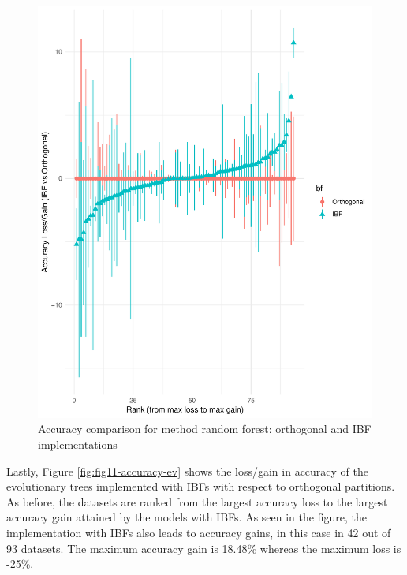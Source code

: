 \documentclass[]{elsarticle} %
\makeatletter
\def\maxwidth{\ifdim\Gin@nat@width>\linewidth\linewidth
\else\Gin@nat@width\fi}
\let\Oldincludegraphics\includegraphics
\renewcommand{\includegraphics}[1]{\Oldincludegraphics[width=\maxwidth]{#1}}
\makeatother
\begin{document}
\begin{figure}[htbp]
\centering
\includegraphics{Trees_with_Base_Functions_v2_files/figure-latex/fig10-accuracy-forest-1.pdf}
\caption{\label{fig:fig10-accuracy-forest}Accuracy comparison for method
random forest: orthogonal and IBF implementations}
\end{figure}

Lastly, Figure \ref{fig:fig11-accuracy-ev} shows the loss/gain in
accuracy of the evolutionary trees implemented with IBFs with respect to
orthogonal partitions. As before, the datasets are ranked from the
largest accuracy loss to the largest accuracy gain attained by the
models with IBFs. As seen in the figure, the implementation with IBFs
also leads to accuracy gains, in this case in 42 out of 93 datasets. The
maximum accuracy gain is 18.48\% whereas the maximum loss is -25\%.
\end{document}
